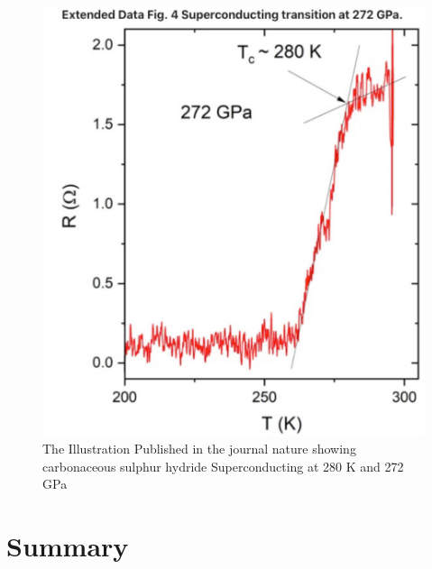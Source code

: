 \documentclass[12pt]{article}
\begin{document}
\begin{figure}[!ht]
    \centering
    \includegraphics[scale=0.5]{Week 5 - Research Paper/Tue, 16 Feb 2021, 14_43.pdf}
    \caption{The Illustration Published in the journal nature showing  carbonaceous sulphur hydride Superconducting at 280 K and 272 GPa \cite{Room-Temperature Superconductivity}} 
    \label{fig:my_label}
\end{figure}


\section{Summary}
\end{document}
